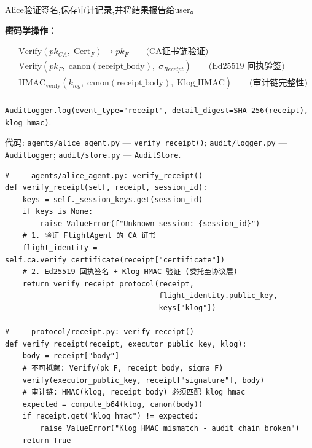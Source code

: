\item [step7] Alice验证签名,保存审计记录,并将结果报告给user。

    \textbf{密码学操作：}
    \begin{coreconcept}
    \begin{align*}
        &\text{Verify}(pk_{CA},\; \text{Cert}_F) \to pk_F \qquad \text{(CA证书链验证)}\\
        &\text{Verify}(pk_F,\; \text{canon}(\text{receipt\_body}),\; \sigma_{Receipt}) \qquad \text{(Ed25519 回执验签)}\\
        &\text{HMAC}_{\text{verify}}(k_{log},\; \text{canon}(\text{receipt\_body}),\; \text{Klog\_HMAC}) \qquad \text{(审计链完整性)}
    \end{align*}
    \\
    \texttt{AuditLogger.log(event\_type="receipt", detail\_digest=SHA-256(receipt), klog\_hmac)}.
    \end{coreconcept}
    代码: \texttt{agents/alice\_agent.py} — \texttt{verify\_receipt()}; \texttt{audit/logger.py} — \texttt{AuditLogger}; \texttt{audit/store.py} — \texttt{AuditStore}.

\begin{lstlisting}[caption={agents/alice\_agent.py — verify\_receipt() ; protocol/receipt.py — verify\_receipt()}]
# --- agents/alice_agent.py: verify_receipt() ---
def verify_receipt(self, receipt, session_id):
    keys = self._session_keys.get(session_id)
    if keys is None:
        raise ValueError(f"Unknown session: {session_id}")
    # 1. 验证 FlightAgent 的 CA 证书
    flight_identity = self.ca.verify_certificate(receipt["certificate"])
    # 2. Ed25519 回执签名 + Klog HMAC 验证 (委托至协议层)
    return verify_receipt_protocol(receipt,
                                   flight_identity.public_key,
                                   keys["klog"])

# --- protocol/receipt.py: verify_receipt() ---
def verify_receipt(receipt, executor_public_key, klog):
    body = receipt["body"]
    # 不可抵赖: Verify(pk_F, receipt_body, sigma_F)
    verify(executor_public_key, receipt["signature"], body)
    # 审计链: HMAC(klog, receipt_body) 必须匹配 klog_hmac
    expected = compute_b64(klog, canon(body))
    if receipt.get("klog_hmac") != expected:
        raise ValueError("Klog HMAC mismatch - audit chain broken")
    return True
\end{lstlisting}